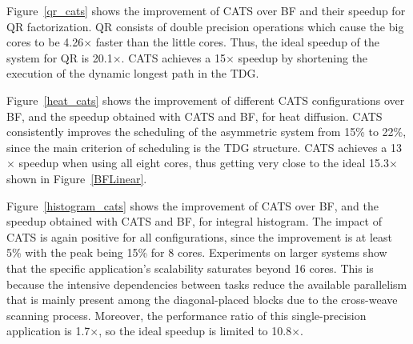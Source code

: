 
Figure~\ref{qr_cats} shows the improvement of CATS over BF and their speedup for QR factorization. 
QR consists of double precision operations which cause the big cores to be 4.26$\times$ faster than the little cores. Thus, the ideal speedup of the system for QR is 20.1$\times$. 
CATS achieves a 15$\times$ speedup by shortening the execution of the dynamic longest path in the TDG. 

Figure~\ref{heat_cats} shows the improvement of different CATS configurations over BF, and the speedup obtained with CATS and BF, for heat diffusion. 
CATS consistently improves the scheduling of the asymmetric system from 15\% to 22\%, since the main criterion of scheduling is the TDG structure. 
CATS achieves a 13$\times$ speedup when using all eight cores, thus getting very close to the ideal 15.3$\times$ shown in Figure~\ref{BFLinear}.

Figure~\ref{histogram_cats} shows the improvement of CATS over BF, and the speedup obtained with CATS and BF, for integral histogram. 
The impact of CATS is again positive for all configurations, since the improvement is at least 5\% with the peak being 15\% for 8 cores. 
Experiments on larger systems show that the specific application's scalability saturates beyond 16 cores. 
This is because the intensive dependencies between tasks reduce the available parallelism that is mainly present among the diagonal-placed blocks due to the cross-weave scanning process. 
Moreover, the performance ratio of this single-precision application is 1.7$\times$, so the ideal speedup is limited to 10.8$\times$.

